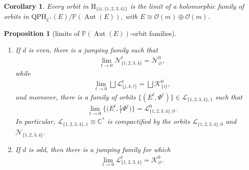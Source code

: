 \documentclass[10pt,a4paper]{amsart}
\newcommand{\field}[1]{\ensuremath{\mathbb{#1}}}
\newcommand{\CC}{\field{C}}
\newcommand{\PP}{\field{P}}
\newcommand{\calO}{\mathcal{O}}
\newcommand{\curly}[1]{\mathscr{#1}}
\newcommand{\cK}{\curly{K}}
\newcommand{\cL}{\curly{L}}
\newcommand{\cN}{\curly{N}}
\newcommand{\qp}{\boldsymbol{\cdot}}
\DeclareMathOperator{\Aut}{Aut}
\numberwithin{equation}{section}
\newtheorem{Corollary}[Theorem]{Corollary}
\newtheorem{Proposition}[Theorem]{Proposition}
 { \theoremstyle{definition}
\newtheorem{Definition}[Theorem]{Definition}
\newtheorem{Note}[Theorem]{Note}
\newtheorem{Example}[Theorem]{Example}
\newtheorem{Remark}[Theorem]{Remark} }
\begin{document}
\begin{Corollary}\label{cor:glue-H}
Every orbit in $\mathrm{H}_{\{\varnothing ,\{1,2,3,4\}\}}$ is the limit of a holomorphic family of orbits in $\mathrm{QPH}_{\CC^{*}}(E)/\PP(\Aut(E))$, with $E\cong \calO(m)\oplus\calO(m)$.
\end{Corollary}

\begin{Proposition}[limits of $\PP(\Aut(E))$-orbit families]\label{prop:glue}\quad
\begin{enumerate}\itemsep=0pt
\item[$(i)$] If $d$ is even, there is a jumping family such that\vspace{-1ex}
\begin{gather*}
\lim\limits_{t\to 0} \cN^{t}_{\{1,2,3,4\}} = \cN^{0}_{\varnothing },
\end{gather*}
while\vspace{-1ex}
\begin{gather*}
\lim\limits_{t\to 0} \bigsqcup \cL^{t}_{\{j,k,l\}} = \bigsqcup\cK^{0}_{\{i\}},
\end{gather*}
and moreover, there is a family of orbits $\{(E^{t}_{\qp},\Phi^{t})\}\in\cL_{\{1,2,3,4\},1}$ such that\vspace{-1ex}
\begin{gather*}
\lim\limits_{t\to 0}\bigg\{\bigg(E^{t}_{\qp},\frac{1}{t}\Phi^{t}\bigg)\bigg\} = \cL^{0}_{\{1,2,3,4\},0}.
\end{gather*}
In particular, $\cL_{\{1,2,3,4\},1}\cong\CC^{*}$ is compactified by the orbits $\cL_{\{1,2,3,4\},0}$ and $\cN_{\{1,2,3,4\}}$.
\item[$(ii)$] If $d$ is odd, then there is a jumping family for which\vspace{-1ex}
\begin{gather*}
\lim\limits_{t\to 0} \cL^{t}_{\{1,2,3,4\}} = \cK^{0}_{\varnothing }.
\end{gather*}
\end{enumerate}
\end{Proposition}
\end{document}
